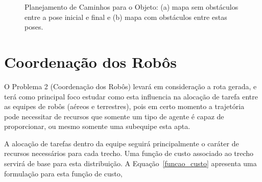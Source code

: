 \begin{figure}[!h]
  \centering


  \caption{Planejamento de Caminhos para o Objeto: (a) mapa sem obstáculos entre a pose inicial e final e (b) mapa com obstáculos entre estas poses.}
  \label{fig:planejamento_objeto}

\end{figure}


\section{Coordenação dos Robôs} %
\label{sub:coordena_o_dos_rob_s}

O Problema 2 (Coordenação dos Robôs) levará em consideração a rota gerada, e terá como principal foco estudar como esta influencia na alocação de tarefa entre as equipes de robôs (aéreos e terrestres), pois em certo momento a trajetória pode necessitar de recursos que somente um tipo de agente é capaz de proporcionar, ou mesmo somente uma subequipe esta apta.

A alocação de tarefas dentro da equipe seguirá principalmente o caráter de recursos necessários para cada trecho. Uma função de custo associado ao trecho servirá de base para esta distribuição. A Equação~\ref{funcao_custo} apresenta uma formulação para esta função de custo,

